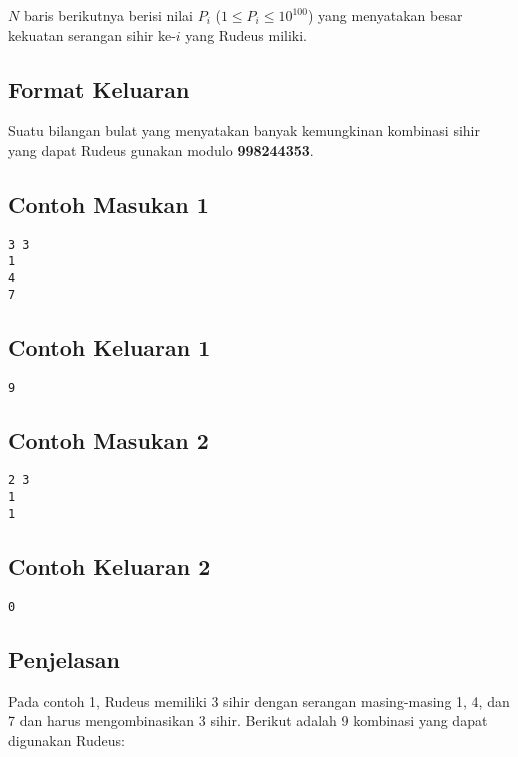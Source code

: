 \documentclass{article}
\begin{document}
$N$ baris berikutnya berisi nilai $P_i$ ($1 \leq P_i \leq 10^{100}$) yang menyatakan besar kekuatan serangan sihir ke-$i$ yang Rudeus miliki.


\subsection*{Format Keluaran}

Suatu bilangan bulat yang menyatakan banyak kemungkinan kombinasi sihir yang dapat Rudeus gunakan modulo \textbf{998244353}.

\begin{multicols}{2}
\subsection*{Contoh Masukan 1}
\begin{lstlisting}
3 3
1
4
7
\end{lstlisting}
\columnbreak
\subsection*{Contoh Keluaran 1}
\begin{lstlisting}
9
\end{lstlisting}
\vfill
\null
\end{multicols}

\begin{multicols}{2}
\subsection*{Contoh Masukan 2}
\begin{lstlisting}
2 3
1
1
\end{lstlisting}
\columnbreak
\subsection*{Contoh Keluaran 2}
\begin{lstlisting}
0
\end{lstlisting}
\vfill
\null
\end{multicols}


\subsection*{Penjelasan}

Pada contoh 1, Rudeus memiliki 3 sihir dengan serangan masing-masing 1, 4, dan 7 dan harus mengombinasikan 3 sihir. Berikut adalah 9 kombinasi yang dapat digunakan Rudeus:
\end{document}

